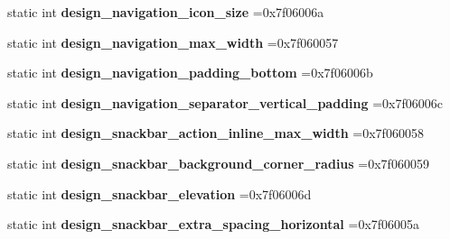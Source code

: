 \begin{DoxyCompactItemize}
static int {\bfseries design\+\_\+navigation\+\_\+icon\+\_\+size} =0x7f06006a
\item 
\mbox{\label{classandroid_1_1support_1_1v7_1_1mediarouter_1_1R_1_1dimen_a3caa7f5873dbf782eb7954a75988a467}} 
static int {\bfseries design\+\_\+navigation\+\_\+max\+\_\+width} =0x7f060057
\item 
\mbox{\label{classandroid_1_1support_1_1v7_1_1mediarouter_1_1R_1_1dimen_a1c50f90617a6addc040caa7c3ef91b17}} 
static int {\bfseries design\+\_\+navigation\+\_\+padding\+\_\+bottom} =0x7f06006b
\item 
\mbox{\label{classandroid_1_1support_1_1v7_1_1mediarouter_1_1R_1_1dimen_a8d3782fbfff0de1d746cad2031bb50e1}} 
static int {\bfseries design\+\_\+navigation\+\_\+separator\+\_\+vertical\+\_\+padding} =0x7f06006c
\item 
\mbox{\label{classandroid_1_1support_1_1v7_1_1mediarouter_1_1R_1_1dimen_a35adf432388093974d13c08f6ea619be}} 
static int {\bfseries design\+\_\+snackbar\+\_\+action\+\_\+inline\+\_\+max\+\_\+width} =0x7f060058
\item 
\mbox{\label{classandroid_1_1support_1_1v7_1_1mediarouter_1_1R_1_1dimen_a60a7fc5b8e9d022d0aabf7ad91771925}} 
static int {\bfseries design\+\_\+snackbar\+\_\+background\+\_\+corner\+\_\+radius} =0x7f060059
\item 
\mbox{\label{classandroid_1_1support_1_1v7_1_1mediarouter_1_1R_1_1dimen_a39e598d9a02d4a529d926181e714bd88}} 
static int {\bfseries design\+\_\+snackbar\+\_\+elevation} =0x7f06006d
\item 
\mbox{\label{classandroid_1_1support_1_1v7_1_1mediarouter_1_1R_1_1dimen_ab2d5b02f592469de0cafd8070282ae7e}} 
static int {\bfseries design\+\_\+snackbar\+\_\+extra\+\_\+spacing\+\_\+horizontal} =0x7f06005a
\item 
\mbox{\label{classandroid_1_1support_1_1v7_1_1mediarouter_1_1R_1_1dimen_a3123024529f8c8c7c48138f5ddef5a1d}} 

\end{DoxyCompactItemize}
